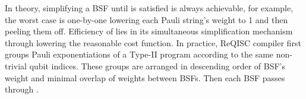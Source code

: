In theory, simplifying a BSF until  is satisfied is always achievable, for example, the worst case is one-by-one lowering each Pauli string's weight to 1 and then peeling them off. Efficiency of  lies in its simultaneous simplification mechanism through lowering the reasonable cost function. In practice, ReQISC compiler first groups Pauli exponentiations of a Type-II program according to the same non-trivial qubit indices. These groups are arranged in descending order of BSF's weight and minimal overlap of weights between BSFs. Then each BSF passes through .






